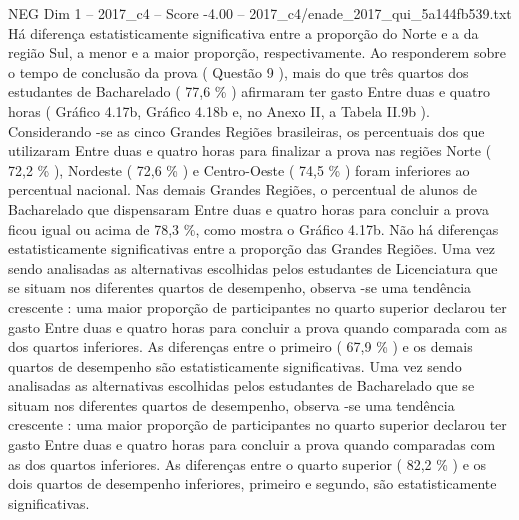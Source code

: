 \begin{textsample}{NEG Dim 1 – 2017\_c4 – Score -4.00 – 2017\_c4/enade\_2017\_qui\_5a144fb539.txt}
Há diferença estatisticamente significativa entre a proporção do Norte e a da região Sul, a menor e a maior proporção, respectivamente.
Ao responderem sobre o tempo de conclusão da prova ( Questão 9 ), mais do que três quartos dos estudantes de Bacharelado ( 77,6 \% ) afirmaram ter gasto Entre duas e quatro horas ( Gráfico 4.17b, Gráfico 4.18b e, no Anexo II, a Tabela II.9b ).
Considerando -se as cinco Grandes Regiões brasileiras, os percentuais dos que utilizaram Entre duas e quatro horas para finalizar a prova nas regiões Norte ( 72,2 \% ), Nordeste ( 72,6 \% ) e Centro-Oeste ( 74,5 \% ) foram inferiores ao percentual nacional.
Nas demais Grandes Regiões, o percentual de alunos de Bacharelado que dispensaram Entre duas e quatro horas para concluir a prova ficou igual ou acima de 78,3 \%, como mostra o Gráfico 4.17b.
Não há diferenças estatisticamente significativas entre a proporção das Grandes Regiões.
Uma vez sendo analisadas as alternativas escolhidas pelos estudantes de Licenciatura que se situam nos diferentes quartos de desempenho, observa -se uma tendência crescente : uma maior proporção de participantes no quarto superior declarou ter gasto Entre duas e quatro horas para concluir a prova quando comparada com as dos quartos inferiores.
As diferenças entre o primeiro ( 67,9 \% ) e os demais quartos de desempenho são estatisticamente significativas.
Uma vez sendo analisadas as alternativas escolhidas pelos estudantes de Bacharelado que se situam nos diferentes quartos de desempenho, observa -se uma tendência crescente : uma maior proporção de participantes no quarto superior declarou ter gasto Entre duas e quatro horas para concluir a prova quando comparadas com as dos quartos inferiores.
As diferenças entre o quarto superior ( 82,2 \% ) e os dois quartos de desempenho inferiores, primeiro e segundo, são estatisticamente significativas.

\end{textsample}
